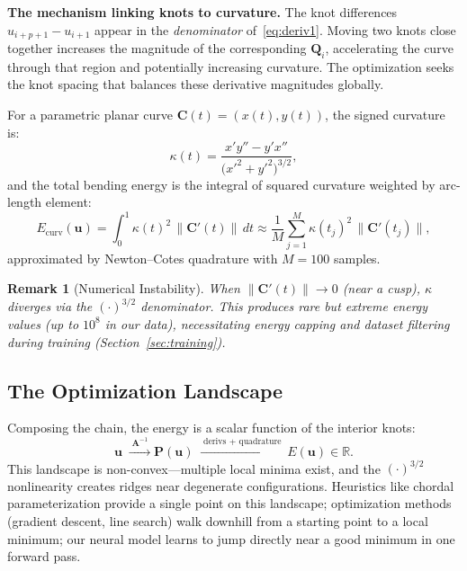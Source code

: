 \documentclass[11pt, a4paper]{article}
\newtheorem{remark}{Remark}
\newcommand{\R}{\mathbb{R}}
\newcommand{\bC}{\mathbf{C}}
\newcommand{\bP}{\mathbf{P}}
\newcommand{\bA}{\mathbf{A}}
\newcommand{\bu}{\mathbf{u}}
\newcommand{\bQ}{\mathbf{Q}}
\newcommand{\norm}[1]{\lVert #1 \rVert}
\begin{document}
\textbf{The mechanism linking knots to curvature.}
The knot differences $u_{i+p+1} - u_{i+1}$ appear in the
\emph{denominator} of~\eqref{eq:deriv1}. Moving two knots close together
increases the magnitude of the corresponding $\bQ_i$, accelerating the
curve through that region and potentially increasing curvature. The
optimization seeks the knot spacing that balances these derivative
magnitudes globally.

For a parametric planar curve $\bC(t) = (x(t), y(t))$, the signed
curvature is:
\begin{equation}
  \kappa(t) = \frac{x'y'' - y'x''}{\bigl(x'^2 + y'^2\bigr)^{3/2}},
  \label{eq:curvature}
\end{equation}
and the total bending energy is the integral of squared curvature weighted
by arc-length element:
\begin{equation}
  E_{\text{curv}}(\bu) =
    \int_0^1 \kappa(t)^2\,\norm{\bC'(t)}\,dt
  \approx \frac{1}{M}\sum_{j=1}^{M}
    \kappa(t_j)^2\,\norm{\bC'(t_j)},
  \label{eq:energy}
\end{equation}
approximated by Newton--Cotes quadrature with $M = 100$ samples.

\begin{remark}[Numerical Instability]
When $\norm{\bC'(t)} \to 0$ (near a cusp), $\kappa$ diverges via the
$({\cdot})^{3/2}$ denominator. This produces rare but extreme energy
values (up to $10^8$ in our data), necessitating energy capping and
dataset filtering during training (Section~\ref{sec:training}).
\end{remark}


\subsection{The Optimization Landscape}

Composing the chain, the energy is a scalar function of the interior knots:
\begin{equation}
  \bu \;\xrightarrow{\;\bA^{-1}\;}
  \bP(\bu) \;\xrightarrow{\;\text{derivs + quadrature}\;}
  E(\bu) \in \R.
  \label{eq:chain}
\end{equation}
This landscape is non-convex---multiple local minima exist, and the
$({\cdot})^{3/2}$ nonlinearity creates ridges near degenerate
configurations. Heuristics like chordal parameterization provide a single
point on this landscape; optimization methods (gradient descent,
line search) walk downhill from a starting point to a local minimum; our
neural model learns to jump directly near a good minimum in one forward
pass.
\end{document}
